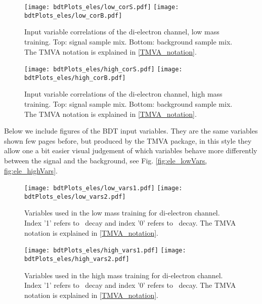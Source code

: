 \begin{figure}[tbp]
  \begin{center}
   \texttt{[image: bdtPlots\_eles/low\_corS.pdf]}
   \texttt{[image: bdtPlots\_eles/low\_corB.pdf]}
    \caption{ Input variable correlations of the di-electron channel, low mass training. Top: signal sample mix. Bottom: background sample mix. The TMVA notation is explained in \ref{TMVA_notation}.}
    \label{fig:ele_cors_low}
  \end{center}
\end{figure}

\begin{figure}[tbp]
  \begin{center}
   \texttt{[image: bdtPlots\_eles/high\_corS.pdf]}
   \texttt{[image: bdtPlots\_eles/high\_corB.pdf]}
    \caption{ Input variable correlations of the di-electron channel, high mass training. Top: signal sample mix. Bottom: background sample mix. The TMVA notation is explained in \ref{TMVA_notation}.}
    \label{fig:ele_cors_high}
  \end{center}
\end{figure}
    
Below we include figures of the BDT input variables. They are the same variables shown few pages before, but produced by the TMVA package, in this style they allow one a bit easier visual judgement of which variables behave more differently between the signal and the background, see Fig. \ref{fig:ele_lowVars, fig:ele_highVars}.

\begin{figure}[H]
  \begin{center}
   \texttt{[image: bdtPlots\_eles/low\_vars1.pdf]}
   \texttt{[image: bdtPlots\_eles/low\_vars2.pdf]}
    \caption{ Variables used in the low mass training for di-electron channel. Index '1' refers to \HBB~decay and index '0' refers to \HZZ~decay. The TMVA notation is explained in \ref{TMVA_notation}.}
    \label{fig:ele_lowVars}
  \end{center}
\end{figure}

\begin{figure}[H]
  \begin{center}
   \texttt{[image: bdtPlots\_eles/high\_vars1.pdf]}
   \texttt{[image: bdtPlots\_eles/high\_vars2.pdf]}
    \caption{ Variables used in the high mass training for di-electron channel. Index '1' refers to \HBB~decay and index '0' refers to \HZZ~decay. The TMVA notation is explained in \ref{TMVA_notation}.}
    \label{fig:ele_highVars}
  \end{center}
\end{figure}

